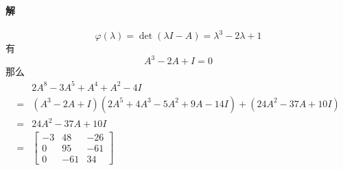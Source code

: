 \documentclass[12pt, a4paper, oneside, fontset=none]{ctexart}
\begin{document}
\paragraph*{解}
\[
    \varphi(\lambda) = \det(\lambda I -A) = \lambda^3 - 2\lambda + 1
\]
有
\[
    A^3 -2A + I = 0
\]
那么
\begin{align*}
      & 2A^8 - 3A^5 + A^4 + A^2 - 4I                                      \\
    = & (A^3 -2A + I)(2A^5 + 4A^3 - 5A^2 + 9A -14 I) +(24A^2 - 37A + 10I) \\
    = & 24A^2 -37A + 10I                                                  \\
    = & \begin{bmatrix}
            -3 & 48  & -26 \\
            0  & 95  & -61 \\
            0  & -61 & 34
        \end{bmatrix}
\end{align*}
\end{document}
